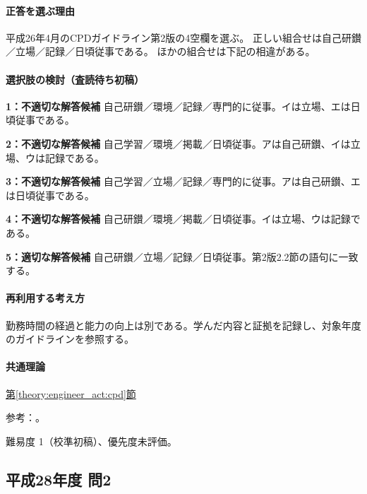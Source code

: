 \paragraph{正答を選ぶ理由} 平成26年4月のCPDガイドライン第2版の4空欄を選ぶ。 正しい組合せは自己研鑚／立場／記録／日頃従事である。 ほかの組合せは下記の相違がある。

\paragraph{選択肢の検討（査読待ち初稿）}

\noindent\textbf{1：不適切な解答候補} 自己研鑚／環境／記録／専門的に従事。イは立場、エは日頃従事である。\par

\noindent\textbf{2：不適切な解答候補} 自己学習／環境／掲載／日頃従事。アは自己研鑚、イは立場、ウは記録である。\par

\noindent\textbf{3：不適切な解答候補} 自己学習／立場／記録／専門的に従事。アは自己研鑚、エは日頃従事である。\par

\noindent\textbf{4：不適切な解答候補} 自己研鑚／環境／掲載／日頃従事。イは立場、ウは記録である。\par

\noindent\textbf{5：適切な解答候補} 自己研鑚／立場／記録／日頃従事。第2版2.2節の語句に一致する。\par

\paragraph{再利用する考え方} 勤務時間の経過と能力の向上は別である。学んだ内容と証拠を記録し、対象年度のガイドラインを参照する。

\paragraph{共通理論} \hyperref[theory:engineer_act:cpd]{第\ref*{theory:engineer_act:cpd}節}

\par 参考：\cite{cpd_v2}。

\par 難易度 1（校準初稿）、優先度未評価。

\subsection{平成28年度 問2}
\label{q:h28-reg-apt-02}

